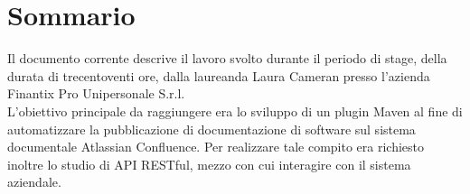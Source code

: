 
\cleardoublepage
{}
{}
\begingroup
\let\clearpage\relax
\let\cleardoublepage\relax
\let\cleardoublepage\relax

\chapter*{Sommario}

Il documento corrente descrive il lavoro svolto durante il periodo di stage, della durata di trecentoventi ore, dalla laureanda Laura Cameran presso l'azienda Finantix Pro Unipersonale S.r.l. \\
L'obiettivo principale da raggiungere era lo sviluppo di un plugin Maven al fine di automatizzare la pubblicazione di documentazione di software sul sistema documentale Atlassian Confluence. 
Per realizzare tale compito era richiesto inoltre lo studio di API RESTful, mezzo con cui interagire con il sistema aziendale.

%
%

\endgroup			

\vfill

